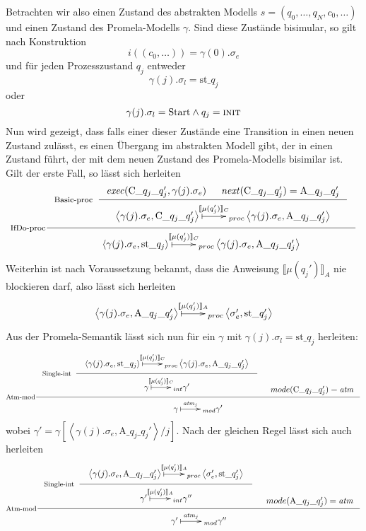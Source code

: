 Betrachten wir also einen Zustand des abstrakten Modells $s=(q_0,\dots,q_N,c_0,\dots)$ und einen Zustand des Promela-Modells $\gamma$.
Sind diese Zustände bisimular, so gilt nach Konstruktion
\[ i((c_0,\dots)) = \gamma(0).\sigma_e \]
und für jeden Prozesszustand $q_j$ entweder
\[ \gamma(j).\sigma_l = \textrm{st\_}q_j \]
oder
\[ \gamma(j).\sigma_l = \textrm{Start} \land q_j = \const{init} \]
Nun wird gezeigt, dass falls einer dieser Zustände eine Transition in einen neuen Zustand zulässt, es einen Übergang im abstrakten Modell gibt, der in einen Zustand führt, der mit dem neuen Zustand des Promela-Modells bisimilar ist.
Gilt der erste Fall, so lässt sich herleiten
\[ \inference[IfDo-proc]{
  \inference[Basic-proc]{\mathit{exec}(\textrm{C\_}q_j\textrm{\_}q_j',\gamma(j).\sigma_e) & \mathit{next}(\textrm{C\_}q_j\textrm{\_}q_j') = \textrm{A\_}q_j\textrm{\_}q_j'}{
  \xymatrix{ \left<\gamma(j).\sigma_e,\textrm{C\_}q_j\textrm{\_}q_j'\right>\ar@{|->}[r]^-{\llbracket \mu(q_j')\rrbracket_C} & _{proc}
    \left<\gamma(j).\sigma_e,\textrm{A\_}q_j\textrm{\_}q_j'\right>}
  }
  }
  { \xymatrix{ \left<\gamma(j).\sigma_e,\textrm{st\_}q_j\right> \ar@{|->}[r]^-{\llbracket \mu(q_j')\rrbracket_C} & _{proc}
      \left<\gamma(j).\sigma_e,\textrm{A\_}q_j\textrm{\_}q_j'\right>}
  }
\]
Weiterhin ist nach Voraussetzung bekannt, dass die Anweisung $\llbracket \mu(q_j')\rrbracket_A$ nie blockieren darf, also lässt sich herleiten
\[
  \xymatrix{ \left<\gamma(j).\sigma_e,\textrm{A\_}q_j\textrm{\_}q_j'\right> \ar@{|->}[r]^-{\llbracket \mu(q_j')\rrbracket_A} & _{proc}
    \left<\sigma_e',\textrm{st\_}q_j'\right> }
\]
Aus der Promela-Semantik lässt sich nun für ein $\gamma$ mit $\gamma(j).\sigma_l = \textrm{st\_}q_j$ herleiten:
\[
\inference[Atm-mod]{
  \inference[Single-int]{
    \xymatrix{ \left<\gamma(j).\sigma_e,\textrm{st\_}q_j\right> \ar@{|->}[r]^-{\llbracket \mu(q_j')\rrbracket_C} & _{proc}
      \left<\gamma(j).\sigma_e,\textrm{A\_}q_j\textrm{\_}q_j'\right> }
  }{
    \xymatrix{ \gamma \ar@{|->}[r]^-{\llbracket \mu(q_j')\rrbracket_C} & _{int}
      \gamma'
    }
  } & mode(\textrm{C\_}q_j\textrm{\_}q_j') = \mathit{atm}
}{
  \xymatrix{ \gamma \ar@{|->}[r]^-{\mathit{atm}_j} & _{mod}
    \gamma'
  }
}
\]
wobei $\gamma' = \gamma[\left<\gamma(j).\sigma_e,\textrm{A\_}q_j\textrm{\_}q_j'\right>/j]$.
Nach der gleichen Regel lässt sich auch herleiten
\[
\inference[Atm-mod]{
  \inference[Single-int]{
    \xymatrix{ \left<\gamma(j).\sigma_e,\textrm{A\_}q_j\textrm{\_}q_j'\right> \ar@{|->}[r]^-{\llbracket \mu(q_j')\rrbracket_A} & _{proc}
      \left<\sigma_e',\textrm{st\_}q_j'\right> }
  }{
    \xymatrix{ \gamma'\ar@{|->}[r]^-{\llbracket \mu(q_j')\rrbracket_A} & _{int}
      \gamma''
    }
  } & mode(\textrm{A\_}q_j\textrm{\_}q_j') = \mathit{atm}
}{
  \xymatrix{ \gamma'\ar@{|->}[r]^-{\mathit{atm}_j} & _{mod}
    \gamma''
  }
}
\]

